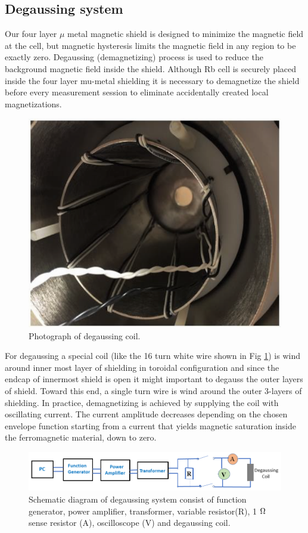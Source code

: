 \subsection{Degaussing system\label{sec:Degaussing}}

Our four layer $\mu$ metal magnetic shield is designed to minimize the
magnetic field at the cell, but magnetic hysteresis limits the
magnetic field in any region to be exactly zero. Degaussing
(demagnetizing) process is used to reduce the background magnetic
field inside the shield. Although Rb cell is securely placed inside
the four layer mu-metal shielding it is necessary to demagnetize the
shield before every measurement session to eliminate accidentally
created local magnetizations.

\begin{figure}%
\centering
\includegraphics[width=0.6\linewidth]{figures/degaussing_coil.png}
\caption{Photograph of degaussing coil.\label{fig:degaussing_ccoil.}}
\end{figure}

 For degaussing a special coil (like the 16 turn white wire  shown in Fig \ref{fig:degaussing_ccoil.}) is wind around inner most layer of shielding  in toroidal configuration
and  since the endcap of innermost shield is open it might important to degauss the outer layers of shield. Toward this end, a single turn wire is wind around the outer 3-layers of shielding.
In practice, demagnetizing is achieved  by supplying the coil with oscillating current. The current amplitude decreases depending on the chosen envelope function starting from a current that yields magnetic saturation inside the ferromagnetic material, down to zero. 
\begin{figure}[h]
\centering
\includegraphics[width=1.0\linewidth]{figures/degaussing_system}
\caption{Schematic diagram of degaussing system consist of function generator, power amplifier, transformer, variable resistor(R), 1 $\ohm$ sense resistor (A), oscilloscope (V) and degaussing coil. \label{fig:schematic-of-degaussing_system.}}
\end{figure}


